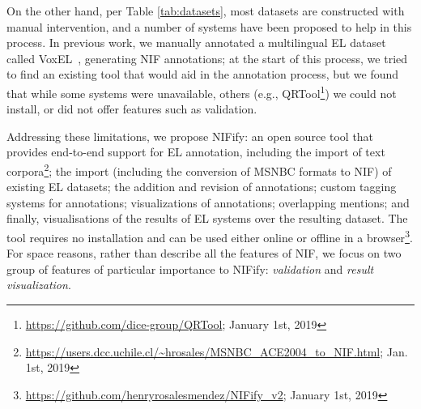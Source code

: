 \documentclass[sigconf]{acmart}
\begin{document}
On the other hand, per Table \ref{tab:datasets}, most datasets are constructed with manual intervention, and a number of systems have been proposed to help in this process. In previous work, we manually annotated a multilingual EL dataset called VoxEL~\cite{VoxEL2018}, generating NIF annotations; at the start of this process, we tried to find an existing tool that would aid in the annotation process, but we found that while some systems were unavailable, others (e.g., QRTool\footnote{\url{https://github.com/dice-group/QRTool}; January 1st, 2019}) we could not install, or did not offer features such as validation.


Addressing these limitations, we propose NIFify: an open source tool that provides end-to-end support for EL annotation, including the import of text corpora\footnote{\url{https://users.dcc.uchile.cl/~hrosales/MSNBC_ACE2004_to_NIF.html}; Jan. 1st, 2019}; the import (including the conversion of MSNBC formats to NIF) of existing EL datasets; the addition and revision of annotations; custom tagging systems for annotations; visualizations of annotations; overlapping mentions; and finally, visualisations of the results of EL systems over the resulting dataset. The tool requires no installation and can be used either online or offline in a browser\footnote{\url{https://github.com/henryrosalesmendez/NIFify_v2}; January 1st, 2019}. For space reasons, rather than describe all the features of NIF, we focus on two group of features of particular importance to NIFify: \textit{validation} and \textit{result visualization}.


\end{document}
